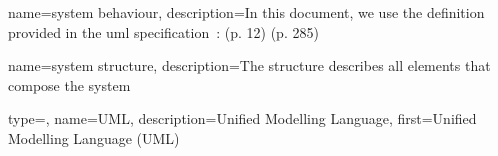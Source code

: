 {
	name={system behaviour},
	description={In this document, we use the definition provided in the \gls{uml} specification~\cite{omg2017umlspec}: (p. 12) (p. 285)}
}

{
	name={system structure},
	description={The structure describes all elements that compose the system}
}

{
	type=\acronymtype,
	name={UML},
	description={Unified Modelling Language},
	first={Unified Modelling Language (UML)}
}
